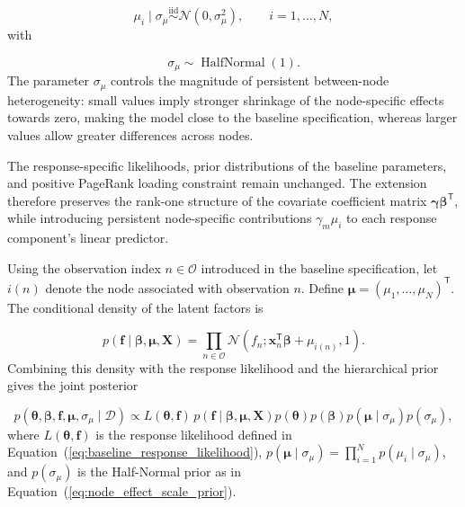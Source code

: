 \documentclass[pdftex,12pt,openright,a4paper,oneside]{book}
\begin{document}
\begin{equation}
\mu_i\mid\sigma_\mu
\overset{\mathrm{iid}}{\sim}
\mathcal{N}(0,\sigma_\mu^2),
\qquad i=1,\ldots,N,
\label{eq:node_effect_prior}
\end{equation}
with

\begin{equation}
\sigma_\mu\sim\operatorname{HalfNormal}(1).
\label{eq:node_effect_scale_prior}
\end{equation}
The parameter $\sigma_\mu$ controls the magnitude
of persistent between-node heterogeneity:
small values imply stronger shrinkage of the
node-specific effects towards zero, making the model close to
the baseline specification, whereas larger values
allow greater differences across nodes.

The response-specific likelihoods, prior distributions
of the baseline parameters, and positive PageRank
loading constraint remain unchanged.
The extension therefore preserves the rank-one
structure of the covariate coefficient matrix
$\boldsymbol{\gamma}\boldsymbol{\beta}^{\mathsf T}$,
while introducing persistent node-specific
contributions $\gamma_m\mu_i$ to each response
component's linear predictor.

Using the observation index $n\in\mathcal{O}$
introduced in the baseline specification, let
$i(n)$ denote the node associated with observation $n$.
Define $\boldsymbol{\mu}=(\mu_1,\ldots,\mu_N)^{\mathsf T}$.
The conditional density of the latent factors is

\begin{equation}
p(\mathbf{f}\mid
\boldsymbol{\beta},\boldsymbol{\mu},\mathbf{X})
=
\prod_{n\in\mathcal{O}}
\mathcal{N}\left(
f_n;
\boldsymbol{x}_n^{\mathsf T}\boldsymbol{\beta}
+\mu_{i(n)},1
\right).
\label{eq:node_factor_density}
\end{equation}
Combining this density with the response likelihood
and the hierarchical prior gives the joint posterior

\begin{equation}
p(\boldsymbol{\theta},\boldsymbol{\beta},
\mathbf{f},\boldsymbol{\mu},\sigma_\mu
\mid\mathcal{D})
\propto
L(\boldsymbol{\theta},\mathbf{f})
\,p(\mathbf{f}\mid
\boldsymbol{\beta},\boldsymbol{\mu},\mathbf{X})
p(\boldsymbol{\theta})
p(\boldsymbol{\beta})
p(\boldsymbol{\mu}\mid\sigma_\mu)
p(\sigma_\mu),
\label{eq:node_joint_posterior}
\end{equation}
where $L(\boldsymbol{\theta},\mathbf{f})$
is the response likelihood defined in
Equation~(\ref{eq:baseline_response_likelihood}),
$p(\boldsymbol{\mu}\mid\sigma_\mu)
=\prod_{i=1}^{N}p(\mu_i\mid\sigma_\mu)$,
and $p(\sigma_\mu)$ is the Half-Normal prior
as in Equation~(\ref{eq:node_effect_scale_prior}).
\end{document}
